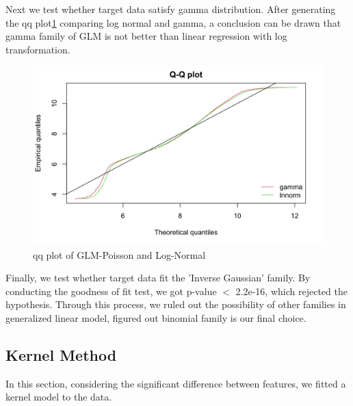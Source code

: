 \documentclass[letterpaper,12pt]{article}
\begin{document}
Next we test whether target data satisfy gamma distribution. After generating the qq plot\ref{fig3} comparing log normal and gamma, a conclusion can be drawn that gamma family of GLM is not better than linear regression with log transformation. 
\begin{figure}
\centering
    \includegraphics[width=0.7\linewidth]{3.png}
    \caption{qq plot of GLM-Poisson and Log-Normal}
    \label{fig3}
\end{figure}

Finally, we test whether target data fit the 'Inverse Gaussian' family. By conducting the goodness of fit test, we got p-value $<$ 2.2e-16, which rejected the hypothesis. Through this process, we ruled out the possibility of other families in generalized linear model, figured out binomial family is our final choice. 

\subsection{Kernel Method}
In this section, considering the significant difference between features, we fitted a kernel model to the data.
\end{document}
